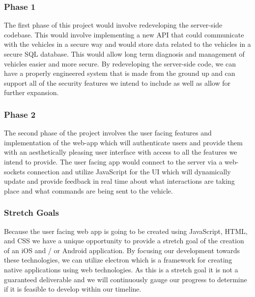 \documentclass[10pt,letterpaper,draftclsnofoot,onecolumn]{IEEEtran}
\begin{document}
\begin{singlespace}
\subsubsection{Phase 1}
The first phase of this project would involve redeveloping the server-side codebase. This would involve implementing a new API that could communicate with the vehicles in a secure way and would store data related to the vehicles in a secure SQL database. This would allow long term diagnosis and management of vehicles easier and more secure. By redeveloping the server-side code, we can have a properly engineered system that is made from the ground up and can support all of the security features we intend to include as well as allow for further expansion.

\subsubsection{Phase 2}
The second phase of the project involves the user facing features and implementation of the web-app which will authenticate users and provide them with an aesthetically pleasing user interface with access to all the features we intend to provide. The user facing app would connect to the server via a web-sockets connection and utilize JavaScript for the UI which will dynamically update and provide feedback in real time about what interactions are taking place and what commands are being sent to the vehicle. 

\subsubsection{Stretch Goals}
Because the user facing web app is going to be created using JavaScript, HTML, and CSS we have a unique opportunity to provide a stretch goal of the creation of an iOS and / or Android application. By focusing our development towards these technologies, we can utilize electron which is a framework for creating native applications using web technologies. As this is a stretch goal it is not a guaranteed deliverable and we will continuously gauge our progress to determine if it is feasible to develop within our timeline. 


\end{singlespace}
\end{document}

